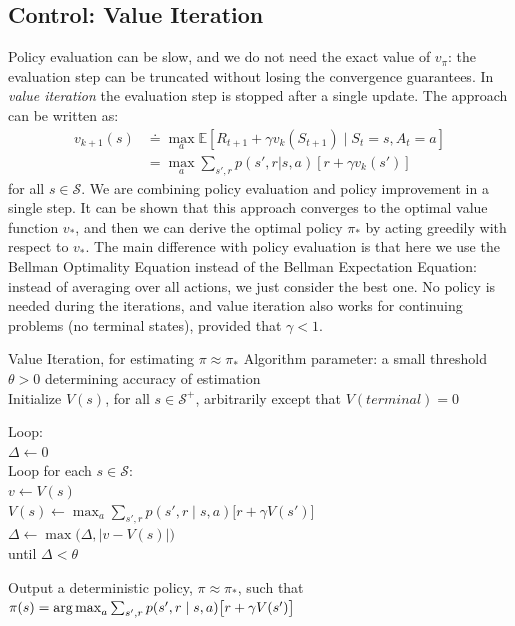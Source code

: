 \subsection{Control: Value Iteration}
Policy evaluation can be slow, and we do not need the exact value of $v_\pi$: the evaluation step can be truncated without losing the convergence guarantees. In \textit{value iteration} the evaluation step is stopped after a single update. The approach can be written as:
\begin{equation}
  \begin{split}
    v_{k+1}(s)&\doteq\max_a\mathbb{E}\left[R_{t+1}+\gamma v_k(S_{t+1})\mid S_t=s,A_t=a\right]\\
    &=\max_a\sum_{s',r}^{}p(s',r|s,a)\left[r+\gamma v_k(s')\right]
  \end{split}
\end{equation}
for all $s\in\mathcal{S}$. We are combining policy evaluation and policy improvement in a single step. It can be shown that this approach converges to the optimal value function $v_*$, and then we can derive the optimal policy $\pi_*$ by acting greedily with respect to $v_*$.
The main difference with policy evaluation is that here we use the Bellman Optimality Equation instead of the Bellman Expectation Equation:
instead of averaging over all actions, we just consider the best one. No policy is needed during the iterations, and value iteration also works for continuing problems (no terminal states), provided that $\gamma<1$.
\begin{algobox}{Value Iteration, for estimating $\pi \approx \pi_*$}
Algorithm parameter: a small threshold $\theta > 0$ determining accuracy of estimation\\
Initialize $V(s)$, for all $s \in \mathcal{S}^+$, arbitrarily except that
$V(\mathit{terminal}) = 0$

\medskip
Loop:\\
\hspace*{1.5em}$\Delta \leftarrow 0$\\
\hspace*{1.5em}Loop for each $s \in \mathcal{S}$:\\
\hspace*{3em}$v \leftarrow V(s)$\\
\hspace*{3em}$V(s) \leftarrow \max_a \sum_{s',r} p(s',r \mid s,a)\bigl[r + \gamma V(s')\bigr]$\\
\hspace*{3em}$\Delta \leftarrow \max\bigl(\Delta, \lvert v - V(s) \rvert\bigr)$\\
until $\Delta < \theta$

\medskip
Output a deterministic policy, $\pi \approx \pi_*$, such that\\
\hspace*{1.5em}$\pi(s) = \operatorname*{arg\,max}_a \sum_{s',r} p(s',r \mid s,a)\bigl[r + \gamma V(s')\bigr]$
\end{algobox}
